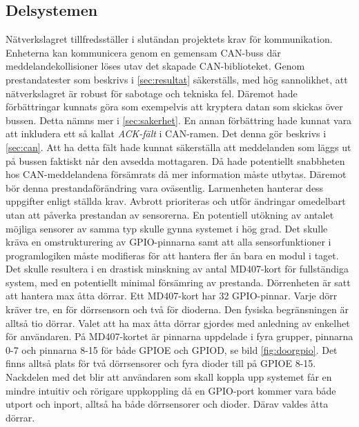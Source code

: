 \subsection{Delsystemen}
Nätverkslagret tillfredsställer i slutändan projektets krav för kommunikation. Enheterna kan kommunicera genom en gemensam CAN-buss där meddelandekollisioner löses utav det skapade CAN-biblioteket. Genom prestandatester som beskrivs i \ref{sec:resultat} säkerställs, med hög sannolikhet, att nätverkslagret är robust för sabotage och tekniska fel. Däremot hade förbättringar kunnats göra som exempelvis att kryptera datan som skickas över bussen. Detta nämns mer i \ref{sec:sakerhet}. En annan förbättring hade kunnat vara att inkludera ett så kallat \textit{ACK-fält} i CAN-ramen. Det denna gör beskrivs i \ref{sec:can}. Att ha detta fält hade kunnat säkerställa att meddelanden som läggs ut på bussen faktiskt når den avsedda mottagaren. Då hade potentiellt snabbheten hos CAN-meddelandena försämrats då mer information måste utbytas. Däremot bör denna prestandaförändring vara oväsentlig.
\newline\newline
Larmenheten hanterar dess uppgifter enligt ställda krav. Avbrott prioriteras och utför ändringar omedelbart utan att påverka prestandan av sensorerna. En potentiell utökning av antalet möjliga sensorer av samma typ skulle gynna systemet i hög grad. Det skulle kräva en omstrukturering av GPIO-pinnarna samt att alla sensorfunktioner i programlogiken måste modifieras för att hantera fler än bara en modul i taget. Det skulle resultera i en drastisk minskning av antal MD407-kort för fullständiga system, med en potentiellt minimal försämring av prestanda. 
\newline\newline
Dörrenheten är satt att hantera max åtta dörrar. Ett MD407-kort har 32 GPIO-pinnar. Varje dörr kräver tre, en för dörrsensorn och två för dioderna. Den fysiska begränsningen är alltså tio dörrar. Valet att ha max åtta dörrar gjordes med anledning av enkelhet för användaren. På MD407-kortet är pinnarna uppdelade i fyra grupper, pinnarna 0-7 och pinnarna 8-15 för både GPIOE och GPIOD, se bild \ref{fig:doorgpio}. 
Det finns alltså plats för två dörrsensorer och fyra dioder till på GPIOE 8-15. Nackdelen med det blir att användaren som skall koppla upp systemet får en mindre intuitiv och rörigare uppkoppling då en GPIO-port kommer vara både utport och inport, alltså ha både dörrsensorer och dioder. Därav valdes åtta dörrar.

